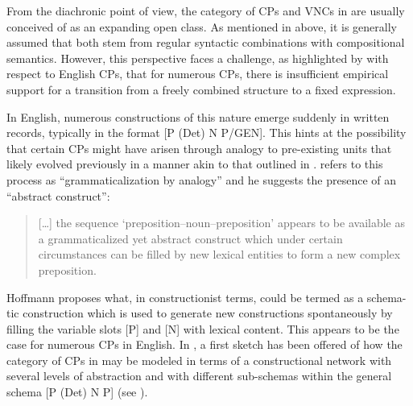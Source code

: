 \documentclass[output=paper,colorlinks,citecolor=brown]{langscibook}
\begin{document}
From the diachronic point of view, the category of CPs and VNCs in  are usually conceived of as an expanding open class. As mentioned in  above, it is generally assumed that both stem from regular syntactic combinations with compositional semantics. However, this perspective faces a challenge, as highlighted by \citet{Hoffmann2005} with respect to English CPs, that for numerous CPs, there is insufficient empirical support for a transition from a freely combined structure to a fixed expression.

In English, numerous constructions of this nature emerge suddenly in written records, typically in the format [P (Det) N P/GEN]. This hints at the possibility that certain CPs might have arisen through analogy to pre-existing units that likely evolved previously in a manner akin to that outlined in . \citet{Hoffmann2005} refers to this process as ``grammaticalization by analogy'' and he suggests the presence of an ``abstract construct'':

\begin{quote}
    […] the sequence ‘preposition–noun–preposition' appears to be available as a grammaticalized yet abstract construct which under certain circumstances can be filled by new lexical entities to form a new complex preposition. \citep[171]{Hoffmann2005}
\end{quote}

Hoffmann proposes what, in constructionist terms, could be termed as a schema-tic construction which is used to generate new constructions spontaneously by filling the variable slots [P] and [N] with lexical content. This appears to be the case for numerous CPs in English. In \citet{Ruffthc}, a first sketch has been offered of how the category of CPs in  may be modeled in terms of a constructional network with several levels of abstraction and with different sub-schemas within the general schema [P (Det) N P] (see ). 
\end{document}
